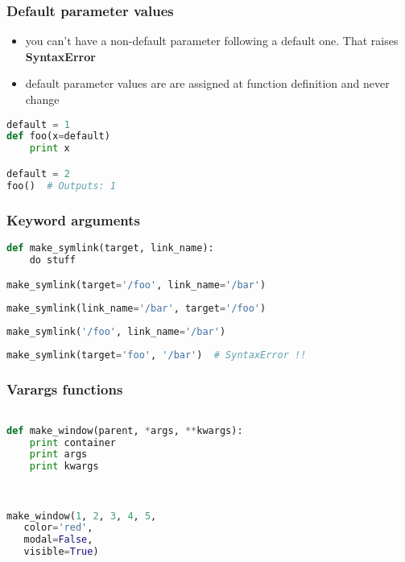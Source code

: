 \documentclass{beamer}
\begin{document}
\begin{frame}[fragile]
\frametitle{Default parameter values}

\begin{itemize}
  \item you can't have a non-default parameter following a default one. That raises {\bf SyntaxError}
  \item default parameter values are are assigned at function definition and never change
\end{itemize}

\pause

\begin{lstlisting}[language=python]
default = 1
def foo(x=default)
    print x

default = 2
foo()  # Outputs: 1
\end{lstlisting}
\end{frame}

\begin{frame}[fragile]
\frametitle{Keyword arguments}

\begin{lstlisting}[language=python]
def make_symlink(target, link_name):
    do stuff

make_symlink(target='/foo', link_name='/bar')
\end{lstlisting}
\pause
\begin{lstlisting}[language=python]
make_symlink(link_name='/bar', target='/foo')
\end{lstlisting}
\pause
\begin{lstlisting}[language=python]
make_symlink('/foo', link_name='/bar')
\end{lstlisting}
\pause
\begin{lstlisting}[language=python]
make_symlink(target='foo', '/bar')  # SyntaxError !!
\end{lstlisting}
\end{frame}


\begin{frame}[fragile]
\frametitle{Varargs functions}

\begin{lstlisting}[language=python]

def make_window(parent, *args, **kwargs):
    print container
    print args     
    print kwargs   
                   
                   

make_window(1, 2, 3, 4, 5,
   color='red',
   modal=False,
   visible=True)

\end{lstlisting}
\end{frame}
\end{document}
